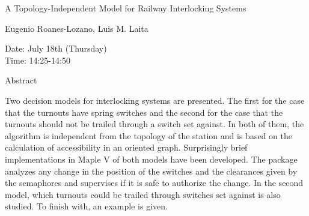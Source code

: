 \begin{center}
\LARGE
A Topology-Independent Model for Railway Interlocking
                             Systems
\end{center}

\begin{center}
\Large
Eugenio Roanes-Lozano, Luis M. Laita

\end{center}

\noindent
Date:  July 18th (Thursday)\\
Time:  14:25-14:50\\

\begin{center}
\large
Abstract
\end{center}

Two decision models for interlocking systems are presented. The first for the case that the turnouts
have spring switches and the second for the case that the turnouts should not be trailed through a
switch set against. In both of them, the algorithm is independent from the topology of the station
and is based on the calculation of accessibility in an oriented graph. Surprisingly brief
implementations in Maple V of both models have been developed. The package analyzes any
change in the position of the switches and the clearances given by the semaphores and supervises if
it is safe to authorize the change. In the second model, which turnouts could be trailed through
switches set against is also studied. To finish with, an example is given. 

